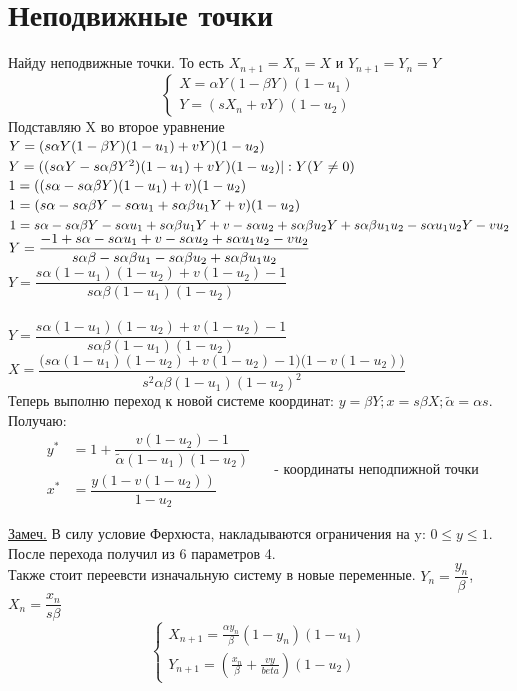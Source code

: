 \documentclass[fleqn]{article}
\begin{document}
\section{Неподвижные точки}
Найду неподвижные точки. То есть $X_{n+1} = X_n = X$ и $Y_{n+1} = Y_n = Y$
\[
\begin{cases}
X = \alpha Y(1-\beta Y)(1-u_1) \\
Y = (sX_n + vY)(1-u_2)
\end{cases}
\]
Подставляю X во второе уравнение \\
$Y = (s \alpha Y (1-\beta Y) (1-u_1) + v Y) (1-u_2) \\$
$ Y = ((s \alpha Y - s \alpha \beta Y^2)(1-u_1) + v Y)(1-u_2) | :Y( Y \neq 0) \\$
$ 1 = ((s\alpha - s\alpha \beta Y)(1-u_1) + v)(1-u_2)  \\$
$ 1 = (s \alpha - s\alpha\beta Y - s\alpha u_1 + s \alpha \beta u_1 Y + v)(1-u_2) \\$
$1 = s\alpha - s\alpha\beta Y - s\alpha u_1 + s\alpha\beta u_1 Y + v 
    - s\alpha u_2 + s\alpha\beta u_2 Y + s\alpha\beta u_1 u_2 
    - s\alpha u_1 u_2 Y - v u_2 \\$
$ Y = \dfrac{-1 + s \alpha  - s \alpha u_1 + v -s \alpha u_2 + s \alpha u_1 u_2 - v u_2}{s \alpha \beta - s \alpha \beta u_1 - s \alpha \beta u_2 + s \alpha \beta u_1 u_2} \\$
$ Y = \dfrac{s \alpha (1-u_1)(1-u_2) + v(1-u_2)-1}{s \alpha \beta (1-u_1)(1-u_2)} $ \\
\\
$Y = \dfrac{s \alpha (1-u_1)(1-u_2) + v(1-u_2)-1}{s \alpha \beta (1-u_1)(1-u_2)}$ \\ 
$X = \dfrac{\big(s\alpha(1-u_1)(1-u_2) + v(1-u_2) - 1\big)\big(1 - v(1-u_2)\big)} {s^2\alpha\beta(1-u_1)(1-u_2)^2} $ \\
Теперь выполню переход к новой системе координат: $ y = \beta Y; x = s \beta X; \tilde{\alpha} = \alpha s$. Получаю: \\
\[
\boxed{
\begin{aligned}
y^{*} &= 1 + \dfrac{v(1-u_2) - 1}{\tilde{\alpha}(1-u_1)(1-u_2)} \\
x^{*} &= \dfrac{y(1 - v(1-u_2))}{1-u_2}
\end{aligned}
}
\quad \text{ - координаты неподпижной точки}
\]

\underline{Замеч.}  В силу условие Ферхюста, накладываются ограничения на y: $ 0 \leq y\leq  1 $.\\
После перехода получил из 6 параметров 4. \\
Также стоит переевсти изначальную систему в новые переменные. $ Y_n = \dfrac{y_n}{\beta} $, $ X_n = \dfrac{x_n}{s \beta} $ \\
\[
\begin{cases}
X_{n+1} = \frac{\alpha y_n}{\beta} (1- y_n)(1-u_1) \\
Y_{n+1} = (\frac{x_n}{\beta} + \frac{vy}{beta})(1-u_2)
\end{cases}
\]
\end{document}
